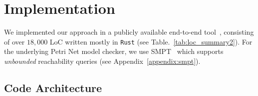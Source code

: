 

\section{Implementation}
\label{sec:implementation}

We implemented our approach in a publicly available end-to-end tool~\cite{ArtifactRepository}, consisting of over $18{,}000$ LoC written mostly in \texttt{Rust} (see Table.~\ref{tab:loc_summary2}).
%
%
For the underlying Petri Net model checker, we use SMPT~\cite{AmDa23} which supports \textit{unbounded} reachability queries (see Appendix~\ref{appendix:smpt}).
%




\subsection{Code Architecture}



